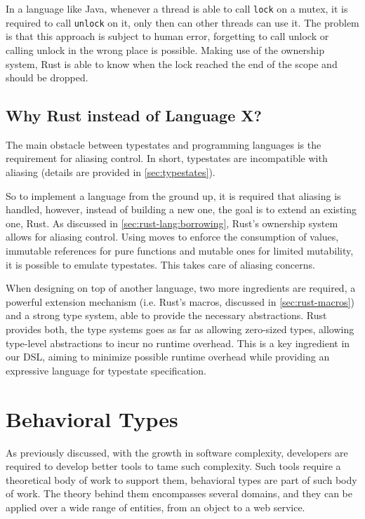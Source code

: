 In a language like Java, whenever a thread is able to call \texttt{lock} on a mutex,
it is required to call \texttt{unlock} on it, only then can other threads can use it.
The problem is that this approach is subject to human error,
forgetting to call unlock or calling unlock in the wrong place is possible.
Making use of the ownership system, Rust is able to know when the lock reached the end of the scope and should be dropped.

\subsection{Why Rust instead of Language X?}

The main obstacle between typestates and programming languages is the requirement for aliasing control.
In short, typestates are incompatible with aliasing (details are provided in \autoref{sec:typestates}).

So to implement a language from the ground up, it is required that aliasing is handled,
however, instead of building a new one, the goal is to extend an existing one, Rust.
As discussed in \autoref{sec:rust-lang:borrowing}, Rust's ownership system allows for aliasing control.
Using moves to enforce the consumption of values,
immutable references for pure functions and mutable ones for limited mutability,
it is possible to emulate typestates. This takes care of aliasing concerns.

When designing on top of another language, two more ingredients are required,
a powerful extension mechanism (i.e. Rust's macros, discussed in \autoref{sec:rust-macros})
and a strong type system, able to provide the necessary abstractions.
Rust provides both, the type systems goes as far as allowing zero-sized types,
allowing type-level abstractions to incur no runtime overhead.
This is a key ingredient in our DSL, aiming to minimize possible runtime overhead while providing an expressive language for typestate specification.

\section{Behavioral Types}\label{sec:behavioral-types}

As previously discussed, with the growth in software complexity, developers are required to develop better tools to tame such complexity.
Such tools require a theoretical body of work to support them, behavioral types are part of such body of work.
The theory behind them encompasses several domains, and they can be applied over a wide range of entities, from an object to a web service.

